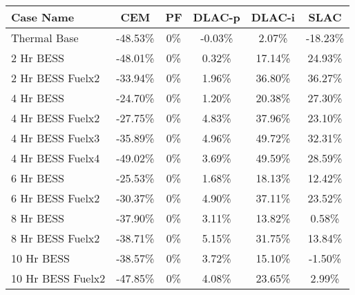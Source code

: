 \begin{tabular}{lccccc}
\toprule
Case Name & CEM & PF & DLAC-p & DLAC-i & SLAC \\
\midrule
Thermal Base & -48.53\% & 0\% & -0.03\% & 2.07\% & -18.23\% \\
2 Hr BESS & -48.01\% & 0\% & 0.32\% & 17.14\% & 24.93\% \\
2 Hr BESS Fuelx2 & -33.94\% & 0\% & 1.96\% & 36.80\% & 36.27\% \\
4 Hr BESS & -24.70\% & 0\% & 1.20\% & 20.38\% & 27.30\% \\
4 Hr BESS Fuelx2 & -27.75\% & 0\% & 4.83\% & 37.96\% & 23.10\% \\
4 Hr BESS Fuelx3 & -35.89\% & 0\% & 4.96\% & 49.72\% & 32.31\% \\
4 Hr BESS Fuelx4 & -49.02\% & 0\% & 3.69\% & 49.59\% & 28.59\% \\
6 Hr BESS & -25.53\% & 0\% & 1.68\% & 18.13\% & 12.42\% \\
6 Hr BESS Fuelx2 & -30.37\% & 0\% & 4.90\% & 37.11\% & 23.52\% \\
8 Hr BESS & -37.90\% & 0\% & 3.11\% & 13.82\% & 0.58\% \\
8 Hr BESS Fuelx2 & -38.71\% & 0\% & 5.15\% & 31.75\% & 13.84\% \\
10 Hr BESS & -38.57\% & 0\% & 3.72\% & 15.10\% & -1.50\% \\
10 Hr BESS Fuelx2 & -47.85\% & 0\% & 4.08\% & 23.65\% & 2.99\% \\
\bottomrule
\end{tabular}
